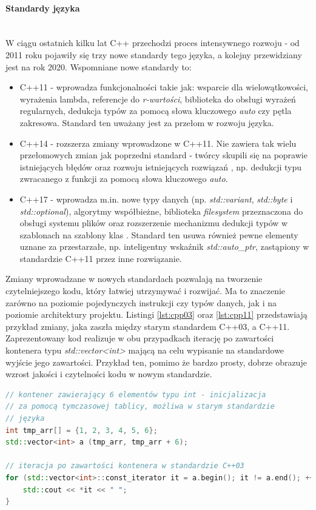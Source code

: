 \paragraph*{Standardy języka}\mbox{} \\
W ciągu ostatnich kilku lat C++ przechodzi proces intensywnego rozwoju - od 2011 roku pojawiły się trzy nowe standardy tego języka, a kolejny przewidziany jest na rok 2020. Wspomniane nowe standardy to:
\begin{itemize}
\item C++11 - wprowadza funkcjonalności takie jak: wsparcie dla wielowątkowości, wyrażenia lambda, referencje do \textit{r-wartości}, biblioteka do obsługi wyrażeń regularnych, dedukcja typów za pomocą słowa kluczowego \textit{auto} czy pętla zakresowa. Standard ten uważany jest za przełom w rozwoju języka.
\item C++14 - rozszerza zmiany wprowadzone w C++11. Nie zawiera tak wielu przełomowych zmian jak poprzedni standard - twórcy skupili się na poprawie istniejących błędów oraz rozwoju istniejących rozwiązań \cite{Cpp14Wikipedia}, np. dedukcji typu zwracanego z funkcji za pomocą słowa kluczowego \textit{auto}.
\item C++17 - wprowadza m.in. nowe typy danych (np. \textit{std::variant}, \textit{std::byte} i \textit{std::optional}), algorytmy współbieżne, biblioteka \textit{filesystem} przeznaczona do obsługi systemu plików oraz rozszerzenie mechanizmu dedukcji typów w szablonach na szablony klas \cite{BartekCodingBlogCpp17}. Standard ten usuwa również pewne elementy uznane za przestarzałe, np. inteligentny wskaźnik \textit{std::auto\_ptr}, zastąpiony w standardzie C++11 przez inne rozwiązanie.
\end{itemize} 
Zmiany wprowadzane w nowych standardach pozwalają na tworzenie czytelniejszego kodu, który łatwiej utrzymywać i rozwijać. Ma to znaczenie zarówno na poziomie pojedynczych instrukcji czy typów danych, jak i na poziomie architektury projektu. Listingi \ref{lst:cpp03} oraz \ref{lst:cpp11} przedstawiają przykład zmiany, jaka zaszła między starym standardem C++03, a C++11. Zaprezentowany kod realizuje w obu przypadkach iterację po zawartości kontenera typu \textit{std::vector<int>} mającą na celu wypisanie na standardowe wyjście jego zawartości. Przykład ten, pomimo że bardzo prosty, dobrze obrazuje wzrost jakości i czytelności kodu w nowym standardzie.

\begin{lstlisting}[language=c++,caption={Przykład kodu w języku C++ napisany z wykorzystaniem standardu C++03},label={lst:cpp03}]
// kontener zawierający 6 elementów typu int - inicjalizacja
// za pomocą tymczasowej tablicy, możliwa w starym standardzie
// języka
int tmp_arr[] = {1, 2, 3, 4, 5, 6};
std::vector<int> a (tmp_arr, tmp_arr + 6);

// iteracja po zawartości kontenera w standardzie C++03
for (std::vector<int>::const_iterator it = a.begin(); it != a.end(); ++it) {
    std::cout << *it << " ";
}
\end{lstlisting}

